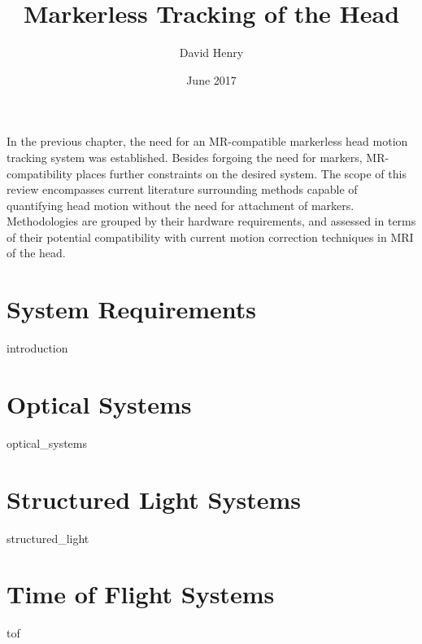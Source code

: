 \documentclass{article}
\title{Markerless Tracking of the Head}
\author{David Henry}
\date{June 2017}
\begin{document}
\maketitle
In the previous chapter, the need for an MR-compatible markerless head motion tracking system was established. Besides forgoing the need for markers, MR-compatibility places further constraints on the desired system. The scope of this review encompasses current literature surrounding methods capable of quantifying head motion without the need for attachment of markers. Methodologies are grouped by their hardware requirements, and assessed in terms of their potential compatibility with current motion correction techniques in MRI of the head.


\section{System Requirements} \label{Section1}
{introduction}

\section{Optical Systems} \label{Section2}
{optical_systems}

\section{Structured Light Systems} \label{Section3}
{structured_light}

\section{Time of Flight Systems} \label{Section4}
{tof}


\printbibliography
\end{document}

